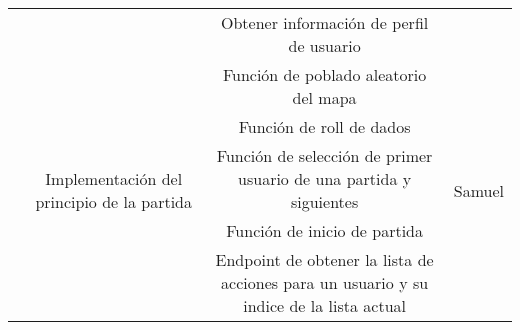 \documentclass[11pt, a4paper, titlepage]{article}
\begin{document}
\begin{landscape}
\begin{table}[hbt!]
\begin{tabular}{c|cc|c|}
\multicolumn{1}{|c|}{}                             & \multicolumn{1}{c|}{}                                                                                                          & Obtener información de perfil de usuario                                                                                                                                                         &                                     \\ \cline{2-4}
\multicolumn{1}{|c|}{}                             & \multicolumn{1}{c|}{\multirow{7}{*}{Implementación del principio de la partida}}                                               & Función de poblado aleatorio del mapa                                                                                                                                                            & \multirow{7}{*}{Samuel}             \\ \cline{3-3}
\multicolumn{1}{|c|}{}                             & \multicolumn{1}{c|}{}                                                                                                          & Función de roll de dados                                                                                                                                                                         &                                     \\ \cline{3-3}
\multicolumn{1}{|c|}{}                             & \multicolumn{1}{c|}{}                                                                                                          & Función de selección de primer usuario de una partida y siguientes                                                                                                                               &                                     \\ \cline{3-3}
\multicolumn{1}{|c|}{}                             & \multicolumn{1}{c|}{}                                                                                                          & Función de inicio de partida                                                                                                                                                                     &                                     \\ \cline{3-3}
\multicolumn{1}{|c|}{}                             & \multicolumn{1}{c|}{}                                                                                                          & Endpoint de obtener la lista de acciones para un usuario y su indice de la lista actual                                                                                                          &                                     \\ \cline{3-3}

\end{tabular}
\end{table}
\end{landscape}
\end{document}
